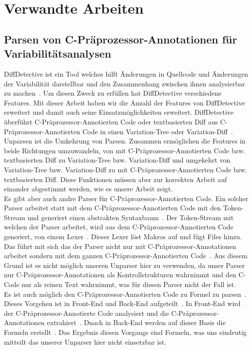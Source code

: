 \chapter{Verwandte Arbeiten}

\section{Parsen von C-Präprozessor-Annotationen für Variabilitätsanalysen}
DiffDetective ist ein Tool welches hilft Änderungen in Quellcode und Änderungen der Variabilität darstellbar und den Zusammenhang zwischen ihnen analysierbar zu machen~\cite{BTS+:ESECFSE22,BSM+:FSE24}. Um diesen Zweck zu erfüllen hat DiffDetective verschiedene Features. Mit dieser Arbeit haben wir die Anzahl der Features von DiffDetective erweitert und damit auch seine Einsatzmöglichkeiten erweitert. DiffDetective  überführt C-Präprozessor-Annotierten Code oder textbasierten Diff aus C-Präprozessor-Annotierten Code in einen Variation-Tree oder Variation-Diff~\cite{BSM+:FSE24}. Unparsen ist die Umkehrung von Parsen. Zusammen ermöglichen die Features in beide Richtungen umzuwandeln, von mit C-Präprozessor-Annotierten Code bzw. textbasierten Diff zu Variation-Tree bzw. Variation-Diff und umgekehrt von Variation-Tree bzw. Variation-Diff zu mit C-Präprozessor-Annotierten Code bzw. textbasierten Diff. Diese Funktionen müssen aber zur korrekten Arbeit auf einander abgestimmt werden, wie es unsere Arbeit zeigt. \\

Es gibt aber auch andre Parser für C-Präprozessor-Annotierten Code. Ein solcher Parser arbeitet statt mit dem C-Präprozessor-Annotierten Code mit den Token-Stream und generiert einen abstrakten Syntaxbaum~\cite{GG:PLDI12,KGR+:OOPSLA11}. Der Token-Stream mit welchen der Parser arbeitet, wird aus dem C-Präprozessor-Annotierten Code generiert, von einem Lexer~\cite{GG:PLDI12,KGR+:OOPSLA11}. Dieser Lexer löst Makros auf und fügt Files hinzu. Das führt mit sich das der Parser nicht nur mit C-Präprozessor-Annotationen arbeitet sondern mit dem ganzen C-Präprozessor-Annotierten Code~\cite{GG:PLDI12,KGR+:OOPSLA11}. Aus diesem Grund ist es nicht möglich unseren Unparser hier zu verwenden, da unser Parser nur C-Präprozessor-Annotationen als Kontrollstrukturen wahrnimmt und den C-Code nur als reinen Text wahrnimmt, was für diesen Parser nicht der Fall ist.\\

Es ist auch möglich den C-Präprozessor-Annotierten Code zu Formel zu parsen~\cite{STLS:GPCE10}. Dieses Vorgehen ist in Front-End und Back-End aufgeteilt~\cite{STLS:GPCE10}. In Front-End wird der C-Präprozessor-Annotierte Code analysiert und die C-Präprozessor-Annotationen extrahiert~\cite{STLS:GPCE10}. Dnach in Back-End werden auf dieser Basis die Formeln erstellt~\cite{STLS:GPCE10}. Das Ergebnis diesen Vorgangs sind Formeln, was uns eindeutig mitteilt das unserer Unparser hier nicht einsetzbar ist.\\


